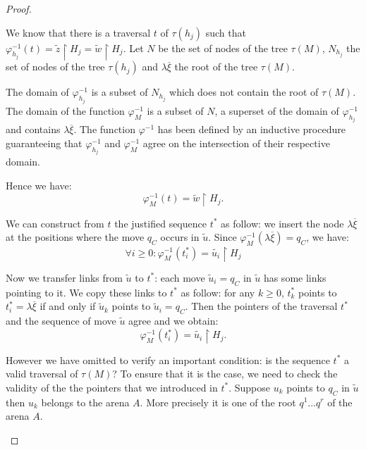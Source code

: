 \begin{proof}
\begin{itemize}
        We know that there is a traversal $t$ of $\tau(h_j)$ such that
        $\varphi^{-1}_{h_j}(t) = \tilde{z}\upharpoonright H_j = \tilde{w}\upharpoonright H_j$.
        Let $N$ be the set of nodes of the tree $\tau(M)$, $N_{h_j}$ the set of nodes
        of the tree $\tau(h_j)$ and $\lambda \overline{\xi}$ the root of the tree
        $\tau(M)$.


        The domain of $\varphi^{-1}_{h_j}$ is a subset of $N_{h_j}$  which does not contain the root of $\tau(M)$.
        The domain of the function $\varphi^{-1}_{M}$ is a subset of $N$, a superset of the domain of
        $\varphi^{-1}_{h_j}$ and contains $\lambda \overline{\xi}$.
        The function $\varphi^{-1}$ has been defined by an inductive procedure
        guaranteeing that $\varphi^{-1}_{h_j}$ and $\varphi^{-1}_{M}$
        agree on the intersection of their respective domain.

        Hence we have:
        \begin{equation}
        \varphi^{-1}_{M}(t) = \tilde{w} \upharpoonright H_j. \label{eq:def_t}
        \end{equation}

        We can construct from $t$ the justified sequence $t^\ast$ as follow:
        we insert the node $\lambda \overline{\xi}$ at the positions where the move $q_C$ occurs in $\tilde{u}$.
        Since $\varphi^{-1}_{M}(\lambda \overline{\xi}) = q_C$, we have:
        $$\forall i \geq 0 : \varphi^{-1}_{M}(t^\ast_i) = \tilde{u_i} \upharpoonright H_j$$

        Now we transfer links from $\tilde{u}$ to $t^\ast$: each move $\tilde{u}_i = q_C$ in $\tilde{u}$ has some links pointing to it.
        We copy these links to $t^\ast$ as follow:
        for any $k\geq 0$, $t^\ast_k$ points to $t^\ast_i = \lambda \overline{\xi}$ if and only if $\tilde{u}_k$ points to $\tilde{u}_i = q_C$.
        Then the pointers of the traversal $t^\ast$ and the sequence of move $\tilde{u}$ agree and we obtain:
        \begin{equation}
        \varphi^{-1}_{M}(t^\ast_i) = \tilde{u_i} \upharpoonright H_j. \label{eq:def_tstar}
        \end{equation}

        However we have omitted to verify an important condition: is the sequence $t^\ast$ a valid traversal of $\tau(M)$?
        To ensure that it is the case, we need to check the validity of the the pointers that we introduced in $t^\ast$.
        Suppose $u_k$ points to $q_C$ in $\tilde{u}$ then $u_k$ belongs to the arena $A$. More precisely it is one
        of the root $q^1 \ldots q^r$ of the arena $A$.


\end{itemize}
\end{proof}
